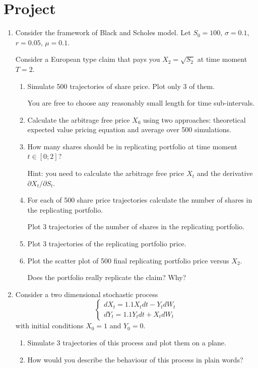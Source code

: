\documentclass[12pt]{article}
\begin{document}
\section*{Project}

\begin{enumerate}

\item Consider the framework of Black and Scholes model.
Let $S_0 =100$, $\sigma = 0.1$, $r=0.05$, $\mu = 0.1$. 

Consider a European type claim that pays you $X_2 = \sqrt{S_2}$ at time moment $T=2$. 

\begin{enumerate}
    \item Simulate 500 trajectories of share price. Plot only 3 of them.
    
    You are free to choose any reasonably small length for time sub-intervals. 

    \item Calculate the arbitrage free price $X_0$ using two approaches:
    theoretical expected value pricing equation and average over 500 simulations. 

    \item How many shares should be in replicating portfolio at time moment $t \in [0;2]$?
    
    Hint: you need to calculate the arbitrage free price $X_t$ and the derivative $\partial X_t/\partial S_t$. 

    \item For each of 500 share price trajectories calculate the number of shares in the replicating portfolio. 
    
    Plot 3 trajectories of the number of shares in the replicating portfolio. 
    
    \item Plot 3 trajectories of the replicating portfolio price. 
    
    \item Plot the scatter plot of 500 final replicating portfolio price versus $X_2$.
    
    Does the portfolio really replicate the claim? Why?
\end{enumerate}

\item Consider a two dimensional stochastic process
\[
    \begin{cases}
    dX_t=1.1X_t dt-Y_t dW_t \\
    dY_t=1.1Y_t dt+X_t dW_t
    \end{cases}
\]
with initial conditions $X_0=1$ and $Y_0=0$.

\begin{enumerate}
    \item Simulate 3 trajectories of this process and plot them on a plane. 
    \item How would you describe the behaviour of this process in plain words?
\end{enumerate}



    
\end{enumerate}
\end{document}
